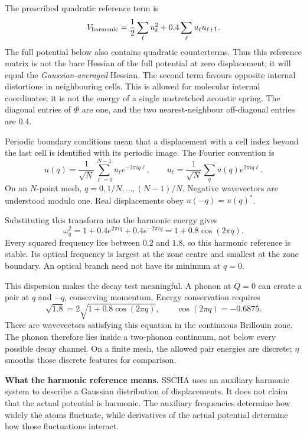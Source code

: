 \documentclass[11pt,a4paper]{article}
\begin{document}
The prescribed quadratic reference term is
\begin{equation}
 V_{\rm harmonic}=\frac12\sum_\ell u_\ell^2
                       +0.4\sum_\ell u_\ell u_{\ell+1}.
\end{equation}
The full potential below also contains quadratic counterterms. Thus this
reference matrix is not the bare Hessian of the full potential at zero
displacement; it will equal the \emph{Gaussian-averaged} Hessian.
The second term favours opposite internal distortions in neighbouring cells.
This is allowed for molecular internal coordinates; it is not the energy of a
single unstretched acoustic spring. The diagonal entries of $\Phi$ are one,
and the two nearest-neighbour off-diagonal entries are $0.4$.

Periodic boundary conditions mean that a displacement with a cell index beyond
the last cell is identified with its periodic image. The Fourier convention is
\begin{equation}
 u(q)=\frac1{\sqrt N}\sum_{\ell=0}^{N-1}u_\ell e^{-2\pi iq\ell},
 \qquad
 u_\ell=\frac1{\sqrt N}\sum_q u(q)e^{2\pi iq\ell}.
\end{equation}
On an $N$-point mesh, $q=0,1/N,\ldots,(N-1)/N$. Negative wavevectors are
understood modulo one. Real displacements obey $u(-q)=u(q)^*$.

Substituting this transform into the harmonic energy gives
\begin{equation}
 \omega_q^2=1+0.4e^{2\pi iq}+0.4e^{-2\pi iq}
           =1+0.8\cos(2\pi q).
\end{equation}
Every squared frequency lies between $0.2$ and $1.8$, so this harmonic reference
is stable. Its optical frequency is largest at the zone centre and smallest
at the zone boundary. An optical branch need not have its minimum at $q=0$.

This dispersion makes the decay test meaningful. A phonon at $Q=0$ can create
a pair at $q$ and $-q$, conserving momentum. Energy conservation requires
\begin{equation}
 \sqrt{1.8}=2\sqrt{1+0.8\cos(2\pi q)},
 \qquad \cos(2\pi q)=-0.6875.
\end{equation}
There are wavevectors satisfying this equation in the continuous Brillouin
zone. The phonon therefore lies inside a two-phonon continuum, not below every
possible decay channel. On a finite mesh, the allowed pair energies are discrete;
$\eta$ smooths those discrete features for comparison.

\textbf{What the harmonic reference means.} SSCHA uses an auxiliary harmonic
system to describe a Gaussian distribution of displacements. It does not
claim that the actual potential is harmonic. The auxiliary frequencies determine
how widely the atoms fluctuate, while derivatives of the actual potential
determine how those fluctuations interact.
\end{document}

